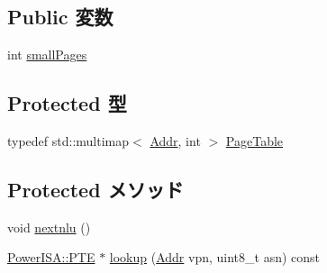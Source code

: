 \subsection*{Public 変数}
\begin{DoxyCompactItemize}
\item 
int \hyperlink{classPowerISA_1_1TLB_a005f53c9e1a19cb4bb0b792e490416b9}{smallPages}
\end{DoxyCompactItemize}
\subsection*{Protected 型}
\begin{DoxyCompactItemize}
\item 
typedef std::multimap$<$ \hyperlink{base_2types_8hh_af1bb03d6a4ee096394a6749f0a169232}{Addr}, int $>$ \hyperlink{classPowerISA_1_1TLB_a18f97eb978c56b976c0eadbf9212d206}{PageTable}
\end{DoxyCompactItemize}
\subsection*{Protected メソッド}
\begin{DoxyCompactItemize}
\item 
void \hyperlink{classPowerISA_1_1TLB_aeb5ba263cf2621ed26767046ab78a1dc}{nextnlu} ()
\item 
\hyperlink{structPowerISA_1_1PTE}{PowerISA::PTE} $\ast$ \hyperlink{classPowerISA_1_1TLB_aa6743f978416251dd93c6dc9ff1d5e82}{lookup} (\hyperlink{base_2types_8hh_af1bb03d6a4ee096394a6749f0a169232}{Addr} vpn, uint8\_\-t asn) const 
\end{DoxyCompactItemize}
